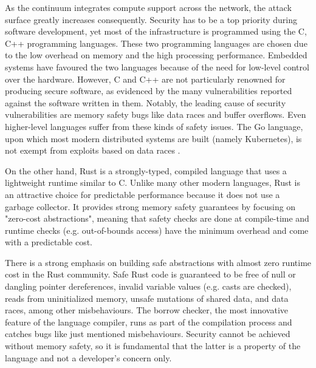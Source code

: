 As the continuum integrates compute support across the network, the attack surface greatly increases consequently. Security has to be a top priority during software development, yet most of the infrastructure is programmed using the C, C++ programming languages. These two programming languages are chosen due to the low overhead on memory and the high processing performance. Embedded systems have favoured the two languages because of the need for low-level control over the hardware. However, C and C++ are not particularly renowned for producing secure software, as evidenced by the many vulnerabilities reported against the software written in them. Notably, the leading cause of security vulnerabilities are memory safety bugs like data races and buffer overflows. Even higher-level languages suffer from these kinds of safety issues. The Go language, upon which most modern distributed systems are built (namely Kubernetes), is not exempt from exploits based on data races \cite{go-data-races}.

On the other hand, Rust is a strongly-typed, compiled language that uses a lightweight runtime similar to C. Unlike many other modern languages, Rust is an attractive choice for predictable performance because it does not use a garbage collector. It provides strong memory safety guarantees by focusing on "zero-cost abstractions", meaning that safety checks are done at compile-time and runtime checks (e.g. out-of-bounds access) have the minimum overhead and come with a predictable cost.


There is a strong emphasis on building safe abstractions with almost zero runtime cost in the Rust community. Safe Rust code is guaranteed to be free of null or dangling pointer dereferences, invalid variable values (e.g. casts are checked), reads from uninitialized memory, unsafe mutations of shared data, and data races, among other misbehaviours.  The borrow checker, the most innovative feature of the language compiler, runs as part of the compilation process and catches bugs like just mentioned misbehaviours. Security cannot be achieved without memory safety, so it is fundamental that the latter is a property of the language and not a developer's concern only.

